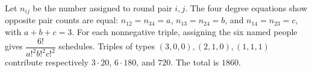 Let $n_{ij}$ be the number assigned to round pair $i,j$. The four degree equations show opposite pair counts are equal: $n_{12}=n_{34}=a$, $n_{13}=n_{24}=b$, and $n_{14}=n_{23}=c$, with $a+b+c=3$. For each nonnegative triple, assigning the six named people gives $\dfrac{6!}{a!^2b!^2c!^2}$ schedules. Triples of types $(3,0,0),(2,1,0),(1,1,1)$ contribute respectively $3\cdot20$, $6\cdot180$, and $720$. The total is $\boxed{1860}$.
